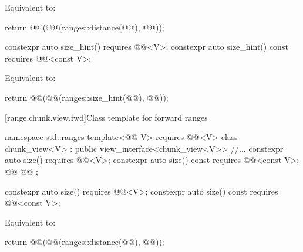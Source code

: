 \documentclass{wg21}
\begin{document}
\begin{itemdescr}
    \pnum
    \effects
    Equivalent to:
    \begin{codeblock}
        return @@(@@(ranges::distance(@@), @@));
    \end{codeblock}
\end{itemdescr}

\begin{addedblock}
\begin{itemdecl}
    constexpr auto size_hint() requires @@<V>;
    constexpr auto size_hint() const requires @@<const V>;
\end{itemdecl}

\begin{itemdescr}
    \pnum
    \effects
    Equivalent to:
    \begin{codeblock}
        return @@(@@(ranges::size_hint(@@), @@));
    \end{codeblock}
\end{itemdescr}
\end{addedblock}

[range.chunk.view.fwd]{Class template  for forward ranges}

%
%
%
\begin{codeblock}
namespace std::ranges {
template<@@ V>
requires @@<V>
class chunk_view<V> : public view_interface<chunk_view<V>> {
   //...
   constexpr auto size() requires @@<V>;
   constexpr auto size() const requires @@<const V>;
   @@
   @@
};
}
\end{codeblock}

\begin{itemdecl}
    constexpr auto size() requires @@<V>;
    constexpr auto size() const requires @@<const V>;
\end{itemdecl}

\begin{itemdescr}
    \pnum
    \effects
    Equivalent to:
    \begin{codeblock}
        return @@(@@(ranges::distance(@@), @@));
    \end{codeblock}
\end{itemdescr}
\end{document}
